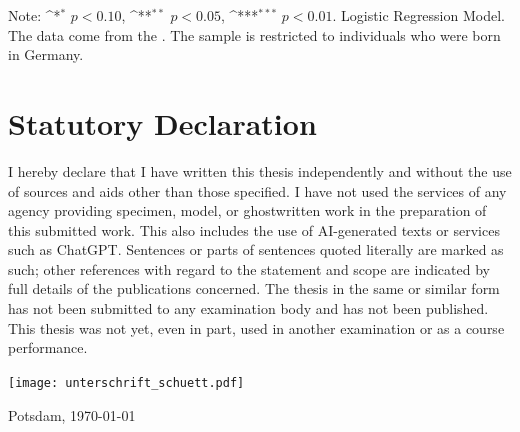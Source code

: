 \documentclass[a4paper, oneside, hyperfootnotes = false]{article}
\def\sym#1{\ifmmode^{#1}\else\(^{#1}\)\fi}
\begin{document}
{\begin{table}[ht]
\begin{center}
		\vspace{2mm}
		
		\parbox{10cm}{
			\linespread{1}\footnotesize Note: \sym{*} \(p<0.10\), \sym{**} \(p<0.05\), \sym{***} \(p<0.01\). Logistic Regression Model. The data come from the \cite{SOEP2023}. The sample is restricted to individuals who were born in Germany.}
		
	\end{center}
\end{table}

\clearpage

}
{\fontsize{11pt}{11pt}\selectfont

{}
\section*{Statutory Declaration}
\label{declarations}

I hereby declare that I have written this thesis independently and without the use of sources and aids other than those specified. I have not used the services of any agency providing specimen, model, or ghostwritten work in the preparation of this submitted work. This also includes the use of AI-generated texts or services such as ChatGPT. Sentences or parts of sentences quoted literally are marked as such; other references with regard to the statement and scope are indicated by full details of the publications concerned. The thesis in the same or similar form has not been submitted to any examination body and has not been published. This thesis was not yet, even in part, used in another examination or as a course performance.

\vspace{1.5cm}

\texttt{[image: unterschrift\_schuett.pdf]}

\noindent Potsdam, \today{}

} %
\end{document}
